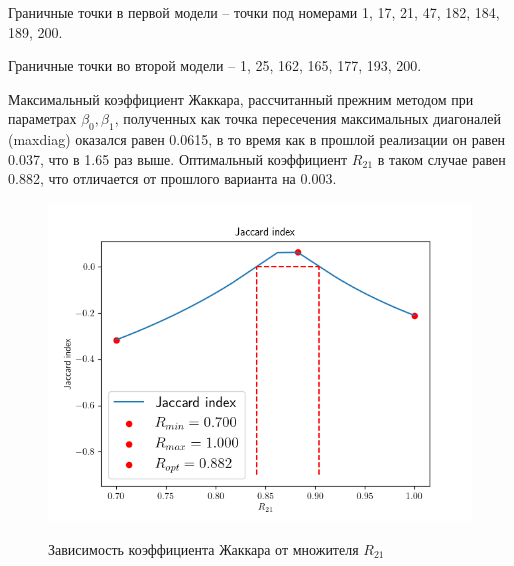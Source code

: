 Граничные точки в первой модели -- точки под номерами 1, 17, 21, 47, 182, 184, 189, 200.

Граничные точки во второй модели -- 1, 25, 162, 165, 177, 193, 200.

Максимальный коэффициент Жаккара, рассчитанный прежним методом при параметрах $\beta_0, \beta_1$, полученных как точка пересечения максимальных диагоналей (maxdiag) оказался равен 0.0615, в то время как в прошлой реализации он равен 0.037, что в 1.65 раз выше. Оптимальный коэффициент $R_{21}$ в таком случае равен 0.882, что отличается от прошлого варианта на 0.003.

\begin{figure}[H]
	\begin{center}
		\includegraphics[scale=0.52]{jaccard}
		\label{pic:jaccard}
		\caption{Зависимость коэффициента Жаккара от множителя $R_{21}$}
	\end{center}
\end{figure}

